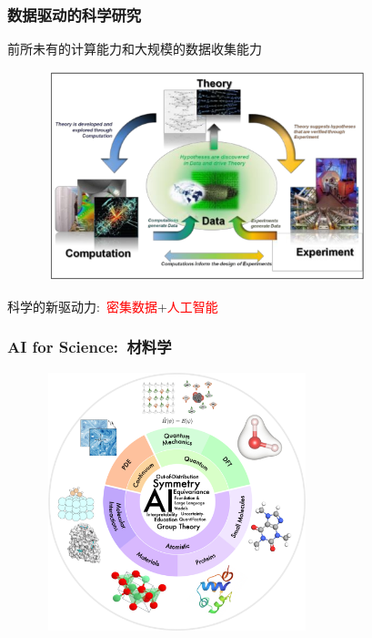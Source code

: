 \frame
{
	\frametitle{数据驱动的科学研究}
前所未有的计算能力和大规模的数据收集能力%
\begin{figure}[h!]
\centering
\includegraphics[height=2.40in,width=3.75in]{Figures/Four_Model_1.png}
\label{Four_Model_1}
\end{figure}
科学的新驱动力:~\textcolor{red}{密集数据}+\textcolor{red}{人工智能}\\
}

\frame
{
	\frametitle{\textrm{AI for Science:}~材料学}
\begin{figure}[h!]
\vspace*{-0.18in}
\centering
\includegraphics[height=2.95in,width=3.05in]{Figures/AI-for-Science.png}
\label{AI_for_Sciences}
\end{figure}
}

